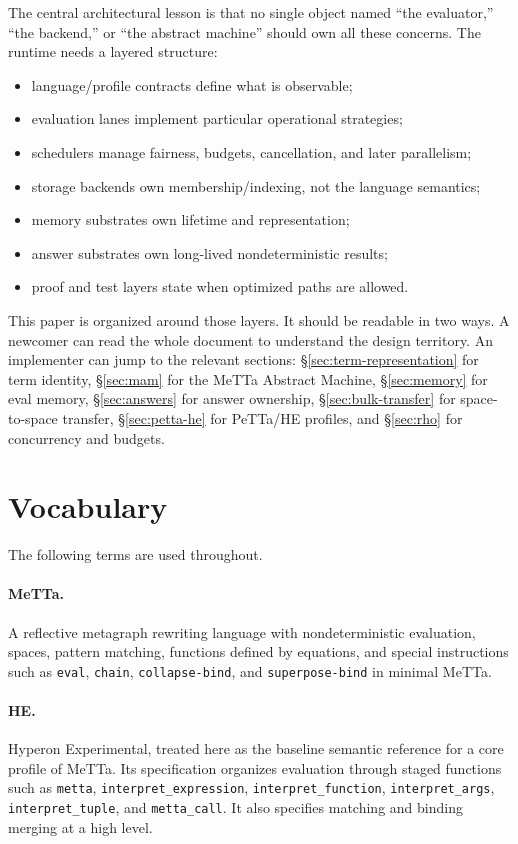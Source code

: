 \documentclass[11pt]{article}
\newcommand{\MeTTa}{MeTTa}
\newcommand{\PeTTa}{PeTTa}
\newcommand{\HE}{HE}
\begin{document}
The central architectural lesson is that no single object named ``the evaluator,'' ``the backend,'' or ``the abstract machine'' should own all these concerns.  The runtime needs a layered structure:

\begin{itemize}[leftmargin=*]
  \item language/profile contracts define what is observable;
  \item evaluation lanes implement particular operational strategies;
  \item schedulers manage fairness, budgets, cancellation, and later parallelism;
  \item storage backends own membership/indexing, not the language semantics;
  \item memory substrates own lifetime and representation;
  \item answer substrates own long-lived nondeterministic results;
  \item proof and test layers state when optimized paths are allowed.
\end{itemize}

This paper is organized around those layers.  It should be readable in two ways.  A newcomer can read the whole document to understand the design territory.  An implementer can jump to the relevant sections: \S\ref{sec:term-representation} for term identity, \S\ref{sec:mam} for the MeTTa Abstract Machine, \S\ref{sec:memory} for eval memory, \S\ref{sec:answers} for answer ownership, \S\ref{sec:bulk-transfer} for space-to-space transfer, \S\ref{sec:petta-he} for \PeTTa{}/\HE{} profiles, and \S\ref{sec:rho} for concurrency and budgets.

\section{Vocabulary}

The following terms are used throughout.

\paragraph{\MeTTa{}.}  A reflective metagraph rewriting language with nondeterministic evaluation, spaces, pattern matching, functions defined by equations, and special instructions such as \texttt{eval}, \texttt{chain}, \texttt{collapse-bind}, and \texttt{superpose-bind} in minimal \MeTTa{}.

\paragraph{\HE{}.}  Hyperon Experimental, treated here as the baseline semantic reference for a core profile of \MeTTa{}.  Its specification organizes evaluation through staged functions such as \texttt{metta}, \texttt{interpret\_expression}, \texttt{interpret\_function}, \texttt{interpret\_args}, \texttt{interpret\_tuple}, and \texttt{metta\_call}.  It also specifies matching and binding merging at a high level.
\end{document}
